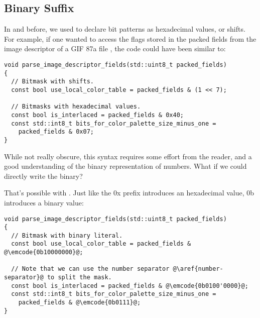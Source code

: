 \subsection{Binary Suffix}

In  and before, we used to declare bit patterns as hexadecimal
values, or shifts. For example, if one wanted to access the flags
stored in the packed fields from the image descriptor of a GIF 87a
file \cite{gif87a}, the code could have been similar to:

\begin{lstlisting}
void parse_image_descriptor_fields(std::uint8_t packed_fields)
{
  // Bitmask with shifts.
  const bool use_local_color_table = packed_fields & (1 << 7);

  // Bitmasks with hexadecimal values.
  const bool is_interlaced = packed_fields & 0x40;
  const std::int8_t bits_for_color_palette_size_minus_one =
    packed_fields & 0x07;
}
\end{lstlisting}

While not really obscure, this syntax requires some effort from the
reader, and a good understanding of the binary representation of
numbers. What if we could directly write the binary?

\bigskip

That's possible with . Just like the 0x prefix introduces an
hexadecimal value, 0b introduces a binary value:

\begin{lstlisting}
void parse_image_descriptor_fields(std::uint8_t packed_fields)
{
  // Bitmask with binary literal.
  const bool use_local_color_table = packed_fields & @\emcode{0b10000000}@;

  // Note that we can use the number separator @\aref{number-separator}@ to split the mask.
  const bool is_interlaced = packed_fields & @\emcode{0b0100'0000}@;
  const std::int8_t bits_for_color_palette_size_minus_one =
    packed_fields & @\emcode{0b0111}@;
}
\end{lstlisting}
